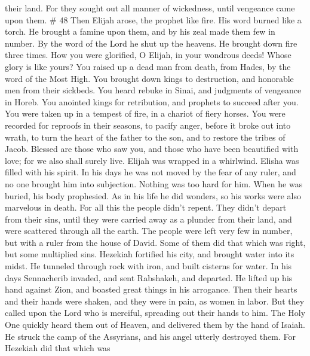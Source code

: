 their land.  For they sought out all manner of wickedness,
until vengeance came upon them. \# 48  Then Elijah arose,
the prophet like fire. His word burned like a torch.  He
brought a famine upon them, and by his zeal made them few in number.
 By the word of the Lord he shut up the heavens. He brought
down fire three times.  How you were glorified, O Elijah, in
your wondrous deeds! Whose glory is like yours?  You raised
up a dead man from death, from Hades, by the word of the Most High.
 You brought down kings to destruction, and honorable men
from their sickbeds.  You heard rebuke in Sinai, and
judgments of vengeance in Horeb.  You anointed kings for
retribution, and prophets to succeed after you.  You were
taken up in a tempest of fire, in a chariot of fiery horses.
 You were recorded for reproofs in their seasons, to pacify
anger, before it broke out into wrath, to turn the heart of the father
to the son, and to restore the tribes of Jacob.  Blessed
are those who saw you, and those who have been beautified with love; for
we also shall surely live.  Elijah was wrapped in a
whirlwind. Elisha was filled with his spirit. In his days he was not
moved by the fear of any ruler, and no one brought him into subjection.
 Nothing was too hard for him. When he was buried, his body
prophesied.  As in his life he did wonders, so his works
were also marvelous in death.  For all this the people
didn't repent. They didn't depart from their sins, until they were
carried away as a plunder from their land, and were scattered through
all the earth. The people were left very few in number, but with a ruler
from the house of David.  Some of them did that which was
right, but some multiplied sins.  Hezekiah fortified his
city, and brought water into its midst. He tunneled through rock with
iron, and built cisterns for water.  In his days
Sennacherib invaded, and sent Rabshakeh, and departed. He lifted up his
hand against Zion, and boasted great things in his arrogance.
 Then their hearts and their hands were shaken, and they
were in pain, as women in labor.  But they called upon the
Lord who is merciful, spreading out their hands to him. The Holy One
quickly heard them out of Heaven, and delivered them by the hand of
Isaiah.  He struck the camp of the Assyrians, and his angel
utterly destroyed them.  For Hezekiah did that which was
